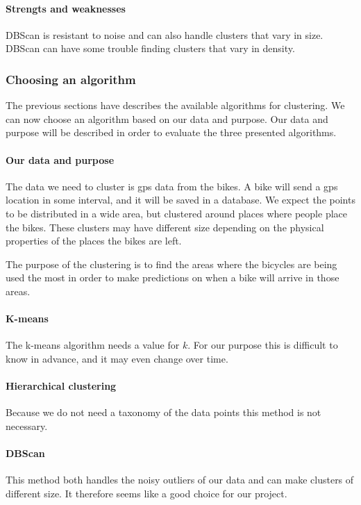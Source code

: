 \paragraph{Strengts and weaknesses}
DBScan is resistant to noise and can also handle clusters that vary in size.
DBScan can have some trouble finding clusters that vary in density.

\subsubsection{Choosing an algorithm}
The previous sections have describes the available algorithms for clustering.
We can now choose an algorithm based on our data and purpose.
Our data and purpose will be described in order to evaluate the three presented algorithms.

\paragraph{Our data and purpose}
The data we need to cluster is gps data from the bikes.
A bike will send a gps location in some interval, and it will be saved in a database.
We expect the points to be distributed in a wide area, but clustered around places where people place the bikes.
These clusters may have different size depending on the physical properties of the places the bikes are left.

The purpose of the clustering is to find the areas where the bicycles are being used the most in order to make predictions on when a bike will arrive in those areas.

\paragraph{K-means}
The k-means algorithm needs a value for $ k $.
For our purpose this is difficult to know in advance, and it may even change over time.

\paragraph{Hierarchical clustering}
Because we do not need a taxonomy of the data points this method is not necessary.

\paragraph{DBScan}
This method both handles the noisy outliers of our data and can make clusters of different size.
It therefore seems like a good choice for our project.


